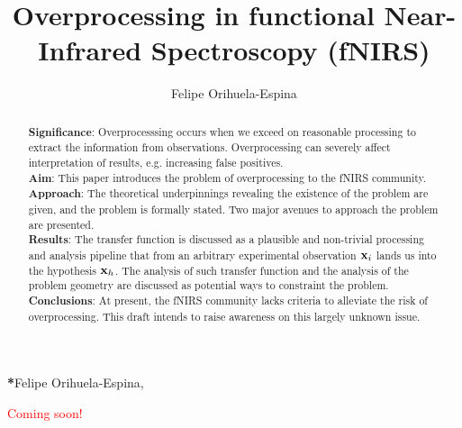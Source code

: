 \documentclass[12pt]{spieman}  %
\title{Overprocessing in functional Near-Infrared Spectroscopy (fNIRS)}
\author[a]{Felipe Orihuela-Espina}
\affil[a]{University of Birmingham, School of Computer Science, Edgbaston, Birmingham, United Kingdom}
\begin{document}
 
\maketitle

\begin{abstract}
\textbf{Significance}: %
Overprocesssing occurs when we exceed on reasonable processing to extract the information from observations. Overprocessing can severely affect interpretation of results, e.g. increasing false positives.\\
\textbf{Aim}: %
This paper introduces the problem of overprocessing to the fNIRS community.\\
\textbf{Approach}: %
The theoretical underpinnings revealing the existence of the problem are given, and the problem is formally stated. Two major avenues to approach the problem are presented.\\
\textbf{Results}: %
The transfer function is discussed as a plausible and non-trivial processing and analysis pipeline that from an arbitrary experimental observation $\color{equationscolor}\mathbf{x}_i$ lands us into the hypothesis $\color{equationscolor}\mathbf{x}_h$. The analysis of such transfer function and the analysis of the problem geometry are discussed as potential ways to constraint the problem.\\
\textbf{Conclusions}: %
At present, the fNIRS community lacks criteria to alleviate the risk of overprocessing. This draft intends to raise awareness on this largely unknown issue. 
\end{abstract}


{\noindent \footnotesize\textbf{*}Felipe Orihuela-Espina,   }

\begin{spacing}{2}   %

\begin{center}
\huge \textcolor{red}{Coming soon!}
\end{center}


\end{spacing}
\end{document}
